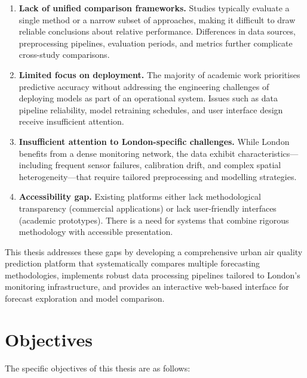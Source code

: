 \begin{enumerate}
    \item \textbf{Lack of unified comparison frameworks.} Studies typically evaluate a single method or a narrow subset of approaches, making it difficult to draw reliable conclusions about relative performance. Differences in data sources, preprocessing pipelines, evaluation periods, and metrics further complicate cross-study comparisons.
    
    \item \textbf{Limited focus on deployment.} The majority of academic work prioritises predictive accuracy without addressing the engineering challenges of deploying models as part of an operational system. Issues such as data pipeline reliability, model retraining schedules, and user interface design receive insufficient attention.
    
    \item \textbf{Insufficient attention to London-specific challenges.} While London benefits from a dense monitoring network, the data exhibit characteristics---including frequent sensor failures, calibration drift, and complex spatial heterogeneity---that require tailored preprocessing and modelling strategies.
    
    \item \textbf{Accessibility gap.} Existing platforms either lack methodological transparency (commercial applications) or lack user-friendly interfaces (academic prototypes). There is a need for systems that combine rigorous methodology with accessible presentation.
\end{enumerate}

This thesis addresses these gaps by developing a comprehensive urban air quality prediction platform that systematically compares multiple forecasting methodologies, implements robust data processing pipelines tailored to London's monitoring infrastructure, and provides an interactive web-based interface for forecast exploration and model comparison.

\section{Objectives}
\label{sec:objectives}

The specific objectives of this thesis are as follows:

